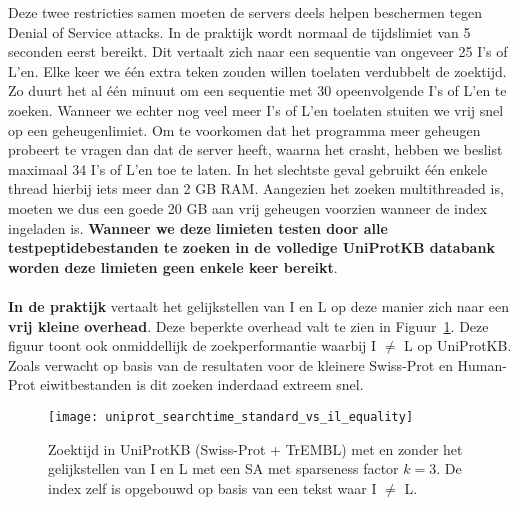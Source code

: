 Deze twee restricties samen moeten de servers deels helpen beschermen tegen Denial of Service attacks.
In de praktijk wordt normaal de tijdslimiet van 5 seconden eerst bereikt.
Dit vertaalt zich naar een sequentie van ongeveer 25 I's of L'en.
Elke keer we één extra teken zouden willen toelaten verdubbelt de zoektijd.
Zo duurt het al één minuut om een sequentie met 30 opeenvolgende I's of L'en te zoeken.
Wanneer we echter nog veel meer I's of L'en toelaten stuiten we vrij snel op een geheugenlimiet.
Om te voorkomen dat het programma meer geheugen probeert te vragen dan dat de server heeft, waarna het crasht, hebben we beslist maximaal 34 I's of L'en toe te laten.
In het slechtste geval gebruikt één enkele thread hierbij iets meer dan 2 GB RAM\@.
Aangezien het zoeken multithreaded is, moeten we dus een goede 20 GB aan vrij geheugen voorzien wanneer de index ingeladen is.
\textbf{Wanneer we deze limieten testen door alle testpeptidebestanden te zoeken in de volledige UniProtKB databank worden deze limieten geen enkele keer bereikt}.
\\ \\
\textbf{In de praktijk} vertaalt het gelijkstellen van I en L op deze manier zich naar een \textbf{vrij kleine overhead}.
Deze beperkte overhead valt te zien in Figuur~\ref{fig:uniprot_search}.
Deze figuur toont ook onmiddellijk de zoekperformantie waarbij I $\neq$ L op UniProtKB\@.
Zoals verwacht op basis van de resultaten voor de kleinere Swiss-Prot en Human-Prot eiwitbestanden is dit zoeken inderdaad extreem snel.

\begin{figure}[ht]
    \centering
    \texttt{[image: uniprot\_searchtime\_standard\_vs\_il\_equality]}
    \caption{Zoektijd in UniProtKB (Swiss-Prot + TrEMBL) met en zonder het gelijkstellen van I en L met een SA met sparseness factor $k = 3$. De index zelf is opgebouwd op basis van een tekst waar I $\neq$ L.}
    \label{fig:uniprot_search}
\end{figure}

